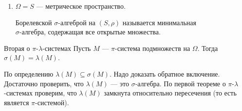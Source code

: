 \begin{example}{}{}
\begin{enumerate}
            Пусть \( n \in \NN \), \( B_n \in \mathcal{B}(\RR^n) \)

            Введем цилиндр с основанием \( B_n \):
            \[
                Cyl(n, B_n) = \{ x \in \RR^{\infty} : (x_1, \ldots, x_n) \in B_n \}
            \]

            \begin{defn}{}{}
                Борелевской (цилиндрической) \( \sigma \)-алгеброй
                на \( \RR^\infty \) называют минимальную \( \sigma \)-алгебру,
                содержащую все цилиндры:
                \[
                    \mathcal{B}(\RR^{\infty}) = \sigma( Cyl(n, B_n) : n \in \NN, B_n \in \mathcal{B}(\RR) )
                \]
            \end{defn}
        \item
            \( \Omega = S \) --- метрическое пространство.

            \begin{defn}{}{}
                Борелевской \( \sigma \)-алгеброй на \( (S, \rho) \)
                называется минимальная \\ \( \sigma \)-алгебра,
                содержащая все открытые множества.
            \end{defn}
    \end{enumerate}
\end{example}

\begin{thrm}{Вторая о \( \pi \)-\( \lambda \)-системах}{}
    Пусть \( M \) --- \( \pi \)-система подмножеств на \( \Omega \).
    Тогда \( \sigma(M) = \lambda(M) \).
\end{thrm}

По определению \( \lambda (M) \subseteq \sigma (M) \).
Надо доказать обратное включение.
Достаточно проверить, что \( \lambda(M) \) ---
это \( \sigma \)-алгебра.
По первой теореме о \( \pi \)-\( \lambda \)-системах
проверим, что \( \lambda(M) \) замкнута относительно
пересечения (то есть является \( \pi \)-системой).

